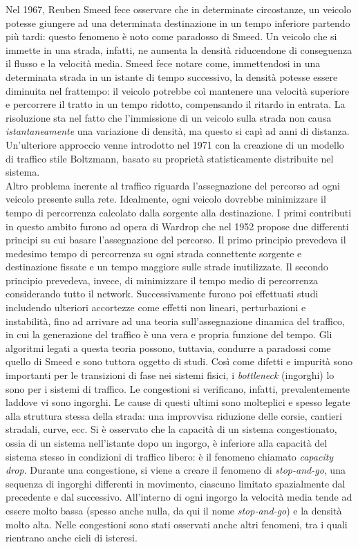 \documentclass[../main.tex]{subfiles}
\begin{document}
Nel 1967, Reuben Smeed fece osservare che in determinate circostanze, un veicolo potesse giungere ad una determinata destinazione in un tempo inferiore partendo pi\`u tardi: questo fenomeno \`e noto come paradosso di Smeed.
Un veicolo che si immette in una strada, infatti, ne aumenta la densit\`a riducendone di conseguenza il flusso e la velocit\`a media.
Smeed fece notare come, immettendosi in una determinata strada in un istante di tempo successivo, la densit\`a potesse essere diminuita nel frattempo: il veicolo potrebbe co\`i mantenere una velocit\`a superiore e percorrere il tratto in un tempo ridotto, compensando il ritardo in entrata.
La risoluzione sta nel fatto che l'immissione di un veicolo sulla strada non causa \emph{istantaneamente} una variazione di densit\`a, ma questo si cap\`i ad anni di distanza.
Un'ulteriore approccio venne introdotto nel 1971 con la creazione di un modello di traffico stile Boltzmann, basato su propriet\`a statisticamente distribuite nel sistema.\\
Altro problema inerente al traffico riguarda l'assegnazione del percorso ad ogni veicolo presente sulla rete.
Idealmente, ogni veicolo dovrebbe minimizzare il tempo di percorrenza calcolato dalla sorgente alla destinazione.
I primi contributi in questo ambito furono ad opera di Wardrop che nel 1952 propose due differenti principi su cui basare l'assegnazione del percorso.
Il primo principio prevedeva il medesimo tempo di percorrenza su ogni strada connettente sorgente e destinazione fissate e un tempo maggiore sulle strade inutilizzate.
Il secondo principio prevedeva, invece, di minimizzare il tempo medio di percorrenza considerando tutto il network.
Successivamente furono poi effettuati studi includendo ulteriori accortezze come effetti non lineari, perturbazioni e instabilit\`a, fino ad arrivare ad una teoria sull'assegnazione dinamica del traffico, in cui la generazione del traffico \`e una vera e propria funzione del tempo.
Gli algoritmi legati a questa teoria possono, tuttavia, condurre a paradossi come quello di Smeed e sono tuttora oggetto di studi.
Cos\`i come difetti e impurit\`a sono importanti per le transizioni di fase nei sistemi fisici, i \emph{bottleneck} (ingorghi) lo sono per i sistemi di traffico.
Le congestioni si verificano, infatti, prevalentemente laddove vi sono ingorghi.
Le cause di questi ultimi sono molteplici e spesso legate alla struttura stessa della strada: una improvvisa riduzione delle corsie, cantieri stradali, curve, ecc.
Si \`e osservato che la capacit\`a di un sistema congestionato, ossia di un sistema nell'istante dopo un ingorgo, \`e inferiore alla capacit\`a del sistema stesso in condizioni di traffico libero: \`e il fenomeno chiamato \emph{capacity drop}.
Durante una congestione, si viene a creare il fenomeno di \emph{stop-and-go}, una sequenza di ingorghi differenti in movimento, ciascuno limitato spazialmente dal precedente e dal successivo.
All'interno di ogni ingorgo la velocit\`a media tende ad essere molto bassa (spesso anche nulla, da qui il nome \emph{stop-and-go}) e la densit\`a molto alta.
Nelle congestioni sono stati osservati anche altri fenomeni, tra i quali rientrano anche cicli di isteresi.
\end{document}
